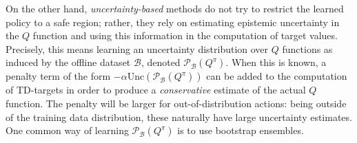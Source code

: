 On the other hand, \textit{uncertainty-based} methods do not try to
restrict the learned policy to a safe region; rather, they rely on
estimating epistemic uncertainty in the $Q$ function and using this
information in the computation of target values. Precisely, this means
learning an uncertainty distribution over $Q$ functions as induced by
the offline dataset $\mathcal{B}$, denoted
$\mathcal{P}_{\mathcal{B}}\left(Q^\pi\right)$. When this is known, a
penalty term of the form
$-\alpha\textrm{Unc}\left(\mathcal{P}_{\mathcal{B}}\left(Q^\pi\right)\right)$
can be added to the computation of TD-targets in order to produce a
\textit{conservative} estimate of the actual $Q$
function. The penalty will be larger for out-of-distribution actions:
being outside of the training data distribution, these naturally have
large uncertainty estimates. One common way of learning
$\mathcal{P}_{\mathcal{B}}\left(Q^\pi\right)$ is to use bootstrap
ensembles.
